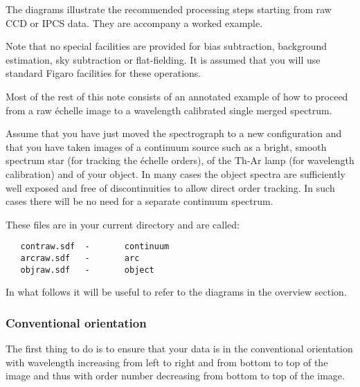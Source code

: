    The diagrams illustrate the recommended processing steps starting
   from raw CCD or IPCS data. They are accompany a worked example.

   Note that no special facilities are provided for bias subtraction,
   background estimation, sky subtraction or flat-fielding. It is
   assumed that you will use standard Figaro facilities for these
   operations.

   Most of the rest of this note consists of an annotated example of how
   to proceed from a raw \'echelle image to a wavelength calibrated
   single merged spectrum.

   Assume that you have just moved the spectrograph to a new
   configuration and that you have taken images of a continuum source
   such as a bright, smooth spectrum star (for tracking the
   \'echelle orders), of the Th-Ar lamp (for wavelength
   calibration) and of your object. In many cases the object spectra are
   sufficiently well exposed and free of discontinuities to allow direct
   order tracking. In such cases there will be no need for a separate
   continuum spectrum.

   These files are in your current directory and are called:

\begin{verbatim}
   contraw.sdf  -       continuum
   arcraw.sdf   -       arc
   objraw.sdf   -       object
\end{verbatim}

   In what follows it will be useful to refer to the diagrams in the
   overview section.


\subsubsection{\label{techno13orient}Conventional orientation}

\begin{latexonly}
\begin{figure}[htb]
\begin{center}
\leavevmode{}
\end{center}
\end{figure}
\end{latexonly}

   The first thing to do is to ensure that your data is in the
   conventional orientation with wavelength increasing from left to
   right and from bottom to top of the image and thus with order number
   decreasing from bottom to top of the image.

